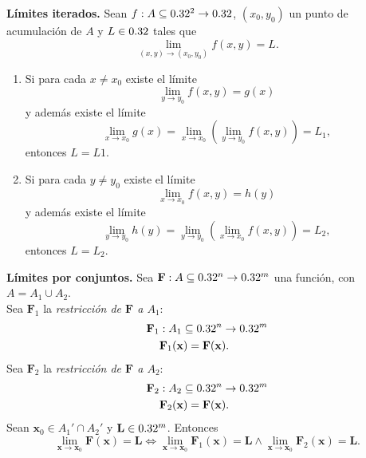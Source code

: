 \begin{propertie}\textbf{L\'imites iterados.} \label{prop:lim_ite}
  Sean $f: A  \subseteq  0.32^2 \to 0.32$, $(x_0,y_0)$ un punto de acumulaci\'on de $A$ y $L \in 0.32$ tales que
  \[
   \lim_{(x,y) \to (x_0,y_0)} f(x,y) = L.
  \]
  \begin{enumerate} %
   \item Si para cada $x \ne x_0$ existe el l\'imite
  \[
   \lim_{y \to y_0} f(x,y) = g(x)
  \]
  y adem\'as existe el l\'imite
  \[
   \lim_{x \to x_0} g(x) = \lim_{x \to x_0} \left( \lim_{y \to y_0} f(x,y) \right) = L_1,
  \]  
  entonces $L = L1$.
  \item Si para cada $y \ne y_0$ existe el l\'imite
  \[
   \lim_{x \to x_0} f(x,y) = h(y)
  \]
  y adem\'as existe el l\'imite
  \[
   \lim_{y \to y_0} h(y) = \lim_{y \to y_0} \left( \lim_{x \to x_0} f(x,y) \right) = L_2, 
  \]
  entonces $L = L_2$.
  \end{enumerate}
\end{propertie}

\begin{propertie}\textbf{L\'imites por conjuntos.} \label{prop:lim_x_conj}
   Sea $\mathbf{F} : A  \subseteq  0.32^n \to 0.32^m$ una funci\'on, con $A = A_1 \cup A_2$.\\
   Sea $\mathbf{F}_1$ la \emph{restricci\'on de $\mathbf{F}$ a $A_1$}:
 \begin{align*}
  \mathbf{F}_1 &: A_1  \subseteq  0.32^n \to 0.32^m \\
  &\mathbf{F}_1(\mathbf{x}) = \mathbf{F}(\mathbf{x}).
 \end{align*}
Sea $\mathbf{F}_2$ la \emph{restricci\'on de $\mathbf{F}$ a $A_2$}:
 \begin{align*}
  \mathbf{F}_2 &: A_2  \subseteq  0.32^n \to 0.32^m \\
  &\mathbf{F}_2(\mathbf{x}) = \mathbf{F}(\mathbf{x}).
 \end{align*}
 Sean $\mathbf{x}_0 \in A_1' \cap A_2'$ y $\mathbf{L} \in 0.32^m$. Entonces
 \[
  \lim_{\mathbf{x} \to \mathbf{x}_0} \mathbf{F}(\mathbf{x}) = \mathbf{L} \iff 
  \lim_{\mathbf{x} \to \mathbf{x}_0} \mathbf{F}_1(\mathbf{x}) = \mathbf{L} \wedge \lim_{\mathbf{x} \to \mathbf{x}_0} \mathbf{F}_2(\mathbf{x}) = \mathbf{L}.
 \]
\end{propertie}


